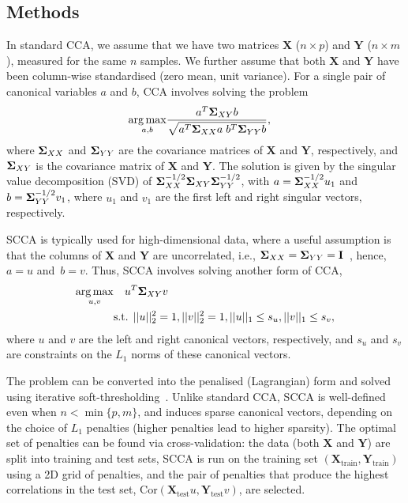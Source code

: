 \vspace*{-12pt}
\begin{methods}
\section{Methods}

In standard CCA, we assume that we have two matrices $\mathbf{X}$ ($n \times p$)
and $\mathbf{Y}$ ($n \times m$), measured for the same $n$ samples.
We further assume that both $\mathbf{X}$ and $\mathbf{Y}$ have been
column-wise standardised (zero mean, unit variance).  For a single pair of 
canonical variables $a$ and $b$, CCA involves solving the problem
\vspace*{-10pt}
\begin{align}
\argmax_{a,b} & \frac{a^T \s_{XY} b}{\sqrt{a^T \s_{XX} a \; b^T \s_{YY} b}},
\label{eqn:cca}
\vspace*{-10pt}
\end{align}
where $\mathbf{\Sigma}_{XX}$ and $\mathbf{\Sigma}_{YY}$ are the covariance matrices of
$\mathbf{X}$ and $\mathbf{Y}$, respectively, and $\mathbf{\Sigma}_{XY}$ is the
covariance matrix of $\mathbf{X}$ and $\mathbf{Y}$. The solution is given by
the singular value decomposition (SVD) of $\mathbf{\Sigma}_{XX}^{-1/2} \mathbf{\Sigma}_{XY}
\mathbf{\Sigma}_{YY}^{-1/2}$, with $a = \mathbf{\Sigma}_{XX}^{-1/2} u_1$ and $b =
\mathbf{\Sigma}_{YY}^{-1/2} v_1$, where $u_1$ and $v_1$ are the first left and right
singular vectors, respectively.

SCCA is typically used for high-dimensional data, where a useful assumption is that
the columns of $\mathbf{X}$ and $\mathbf{Y}$ are uncorrelated,
i.e., $\mathbf{\Sigma}_{XX}=\mathbf{\Sigma}_{YY}=\mathbf{I}$~\citep{Parkhomenko2009},
hence, $a = u$ and~$b = v$. Thus, SCCA involves solving another form of CCA,
\vspace*{-6pt}
\begin{align}
\argmax_{u,v} &  \quad u^T \s_{XY} v \notag \\
 & \mbox{s.t. } ||u||_2^2=1, ||v||_2^2 = 1, ||u||_1 \le s_u, ||v||_1 \le s_v,
\label{eqn:scca}\vspace*{-10pt}
\end{align}
where $u$ and $v$ are the left and right canonical vectors, respectively, and
$s_u$ and $s_v$ are constraints on the $L_1$ norms of these canonical vectors.

The problem can be converted into the penalised (Lagrangian) form and
solved using iterative soft-thresholding~\citep{Parkhomenko2009}.
Unlike standard CCA, SCCA is well-defined even when $n{<}\min\{p, m\}$,
and induces sparse canonical vectors, depending on the choice of
$L_1$ penalties (higher penalties lead to higher sparsity). The optimal set
of penalties can be found via cross-validation: the data (both $\mathbf{X}$
and $\mathbf{Y}$) are split into training and test sets, SCCA is run on
the training set $(\mathbf{X}_{\mbox{train}}, \mathbf{Y}_{\mbox{train}})$
using a 2D grid of penalties, and the pair of penalties that produce the
highest correlations in the test set, $\mbox{Cor}(\mathbf{X}_{\mbox{test}}
u, \mathbf{Y}_{\mbox{test}} v)$, are selected.


\end{methods}

